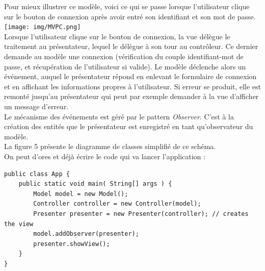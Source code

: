 \documentclass{article}
\begin{document}
Pour mieux illustrer ce modèle, voici ce qui se passe lorsque l'utilisateur clique sur le bouton de connexion après avoir entré son identifiant et son mot de passe. \\
\texttt{[image: img/MVPC.png]}\\
Lorsque l'utilisateur clique sur le bouton de connexion, la vue délègue le traitement au présentateur, lequel le délègue à son tour au contrôleur. Ce dernier demande au modèle une connexion (vérification du couple identifiant-mot de passe, et récupération de l'utilisateur si valide). Le modèle déclenche alors un événement, auquel le présentateur répond en enlevant le formulaire de connexion et en affichant les informations propres à l'utilisateur. Si erreur se produit, elle est remonté jusqu'au présentateur qui peut par exemple demander à la vue d'afficher un message d'erreur. \\
Le mécanisme des événements est géré par le pattern \textit{Observer}. C'est à la création des entités que le présentateur est enregistré en tant qu'observateur du modèle. \\
La figure 5 présente le diagramme de classes simplifié de ce schéma.\\
On peut d'ores et déjà écrire le code qui va lancer l'application :
\begin{verbatim}
public class App {
    public static void main( String[] args ) {
        Model model = new Model();
        Controller controller = new Controller(model);
        Presenter presenter = new Presenter(controller); // creates the view
        model.addObserver(presenter);
        presenter.showView();
    }
}
\end{verbatim}
\end{document}
